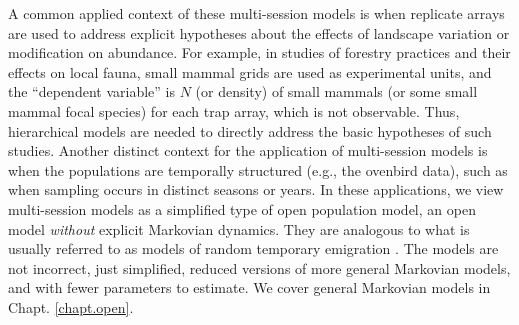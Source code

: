 A common applied context of these multi-session models is when
replicate arrays are used to address explicit hypotheses about the
effects of landscape variation or modification on abundance. For
example, in studies of forestry practices and their effects on local
fauna, small mammal grids are used as experimental units, and the
``dependent variable'' is $N$ (or density) of small mammals (or some
small mammal focal species) for each trap array, which is not
observable.  Thus, hierarchical models are needed to directly address
the basic hypotheses of such studies.  Another distinct context for
the application of multi-session models is when the populations are
temporally structured (e.g., the ovenbird data), such as when sampling
occurs in distinct seasons or years.  In these applications, we view
multi-session models as a simplified type of open population model, an
open model {\it without} explicit Markovian dynamics. They are
analogous to what is usually referred to as models of random temporary
emigration \citep{kendall_etal:1997, chandler_etal:2011}.  The models
are not incorrect, just simplified, reduced versions of more general
Markovian models, and with fewer parameters to estimate.  We cover
general Markovian models in Chapt. \ref{chapt.open}.















